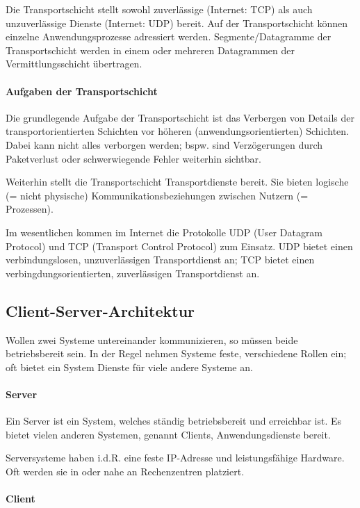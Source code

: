 \documentclass[a4paper, 14pt]{article}
\begin{document}
	Die Transportschicht stellt sowohl zuverlässige (Internet: TCP) als auch unzuverlässige Dienste (Internet: UDP) bereit.
	Auf der Transportschicht können einzelne Anwendungsprozesse adressiert werden.
	Segmente/Datagramme der Transportschicht werden in einem oder mehreren Datagrammen der Vermittlungsschicht übertragen.

	\paragraph{Aufgaben der Transportschicht}
	
	Die grundlegende Aufgabe der Transportschicht ist das Verbergen von Details der transportorientierten Schichten vor höheren (anwendungsorientierten) Schichten.
	Dabei kann nicht alles verborgen werden; bspw. sind Verzögerungen durch Paketverlust oder schwerwiegende Fehler weiterhin sichtbar.

	Weiterhin stellt die Transportschicht Transportdienste bereit.
	Sie bieten logische (= nicht physische) Kommunikationsbeziehungen zwischen Nutzern (= Prozessen).

	Im wesentlichen kommen im Internet die Protokolle UDP (User Datagram Protocol) und TCP (Transport Control Protocol) zum Einsatz.
	UDP bietet einen verbindungslosen, unzuverlässigen Transportdienst an; TCP bietet einen verbingdungsorientierten, zuverlässigen Transportdienst an.

	\subsection{Client-Server-Architektur}

	Wollen zwei Systeme untereinander kommunizieren, so müssen beide betriebsbereit sein.
	In der Regel nehmen Systeme feste, verschiedene Rollen ein; oft bietet ein System Dienste für viele andere Systeme an.

	\paragraph{Server}

	Ein Server ist ein System, welches ständig betriebsbereit und erreichbar ist.
	Es bietet vielen anderen Systemen, genannt Clients, Anwendungsdienste bereit.

	Serversysteme haben i.d.R. eine feste IP-Adresse und leistungsfähige Hardware.
	Oft werden sie in oder nahe an Rechenzentren platziert.

	\paragraph{Client}
\end{document}
